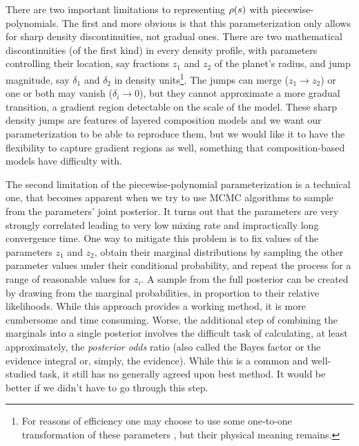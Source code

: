 There are two important limitations to representing $\rho(s)$ with
piecewise-polynomials. The first and more obvious is that this parameterization
only allows for sharp density discontinuities, not gradual ones. There are two
mathematical discontinuities (of the first kind) in every density profile, with
parameters controlling their location, say fractions $z_1$ and $z_2$ of the
planet's radius, and jump magnitude, say $\delta_1$ and $\delta_2$ in density
units\footnote{For reasons of efficiency one may choose to use some one-to-one
transformation of these parameters \citep[e.g.][Appendix B]{Movshovitz2020}, but
their physical meaning remains.}. The jumps can merge ($z_1\to{}z_2$) or one or
both may vanish ($\delta_i\to{0}$), but they cannot approximate a more gradual
transition, a gradient region detectable on the scale of the model. These sharp
density jumps are features of layered composition models and we want our
parameterization to be able to reproduce them, but we would like it to have the
flexibility to capture gradient regions as well, something that
composition-based models have difficulty with.

The second limitation of the piecewise-polynomial parameterization is a
technical one, that becomes apparent when we try to use MCMC algorithms to
sample from the parameters' joint posterior. It turns out that the parameters
are very strongly correlated leading to very low mixing rate and impractically
long convergence time. One way to mitigate this problem is to fix values of the
parameters $z_1$ and $z_2$, obtain their marginal distributions by sampling the
other parameter values under their conditional probability, and repeat the
process for a range of reasonable values for $z_i$. A sample from the full
posterior can be created by drawing from the marginal probabilities, in
proportion to their relative likelihoods. While this approach provides a working
method, it is more cumbersome and time consuming. Worse, the additional step of
combining the marginals into a single posterior involves the difficult task of
calculating, at least approximately, the \emph{posterior odds} ratio (also
called the Bayes factor or the evidence integral or, simply, the evidence).
While this is a common and well-studied task, it still has no generally agreed
upon best method. It would be better if we didn't have to go through this step.